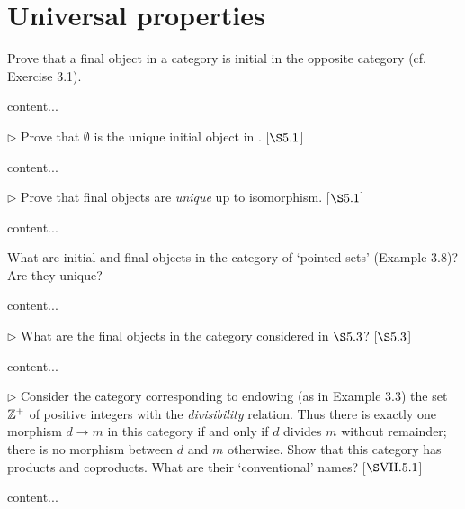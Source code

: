 \section{Universal properties}
\extitle
	
\begin{exercise}
	Prove that a final object in a category  is initial in the opposite category   (cf. Exercise 3.1).
\end{exercise}
\begin{solution}
	content...
\end{solution}

\begin{exercise}
	\(\triangleright\) Prove that \(\emptyset\) is the unique initial object in . [\(\S 5.1\)]
\end{exercise}
\begin{solution}
	content...
\end{solution}

\begin{exercise}
	\(\triangleright\) Prove that final objects are \textit{unique} up to isomorphism. [\(\S 5.1\)]
\end{exercise}
\begin{solution}
	content...
\end{solution}

\begin{exercise}
	What are initial and final objects in the category of ‘pointed sets’ (Example 3.8)? Are they unique?
\end{exercise}
\begin{solution}
	content...
\end{solution}

\begin{exercise}
	\(\triangleright\) What are the final objects in the category considered in \(\S 5.3\)? [\(\S 5.3\)]
\end{exercise}
\begin{solution}
	content...
\end{solution}

\begin{exercise}
	\(\triangleright\) Consider the category corresponding to endowing (as in Example 3.3) the set \(\mathbb{Z}^+\) of positive integers with the \textit{divisibility} relation. Thus there is exactly one morphism \(d \to m\) in this category if and only if \(d\) divides \(m\) without remainder; there is no morphism between \(d\) and \(m\) otherwise. Show that this category has products and coproducts. What are their ‘conventional’ names? [\(\S \RNo{7}.5.1\)]
\end{exercise}
\begin{solution}
	content...
\end{solution}

